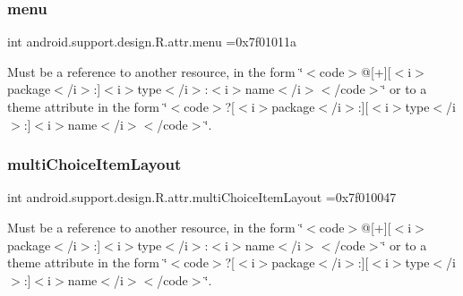 \subsubsection{\texorpdfstring{menu}{menu}}
{\footnotesize\ttfamily int android.\+support.\+design.\+R.\+attr.\+menu =0x7f01011a\hspace{0.3cm}{\ttfamily [static]}}

Must be a reference to another resource, in the form \char`\"{}$<$code$>$@\mbox{[}+\mbox{]}\mbox{[}$<$i$>$package$<$/i$>$\+:\mbox{]}$<$i$>$type$<$/i$>$\+:$<$i$>$name$<$/i$>$$<$/code$>$\char`\"{} or to a theme attribute in the form \char`\"{}$<$code$>$?\mbox{[}$<$i$>$package$<$/i$>$\+:\mbox{]}\mbox{[}$<$i$>$type$<$/i$>$\+:\mbox{]}$<$i$>$name$<$/i$>$$<$/code$>$\char`\"{}. \mbox{\label{classandroid_1_1support_1_1design_1_1R_1_1attr_a52df08b0a39a788dc12dab79f50da855}} 
\subsubsection{\texorpdfstring{multi\+Choice\+Item\+Layout}{multiChoiceItemLayout}}
{\footnotesize\ttfamily int android.\+support.\+design.\+R.\+attr.\+multi\+Choice\+Item\+Layout =0x7f010047\hspace{0.3cm}{\ttfamily [static]}}

Must be a reference to another resource, in the form \char`\"{}$<$code$>$@\mbox{[}+\mbox{]}\mbox{[}$<$i$>$package$<$/i$>$\+:\mbox{]}$<$i$>$type$<$/i$>$\+:$<$i$>$name$<$/i$>$$<$/code$>$\char`\"{} or to a theme attribute in the form \char`\"{}$<$code$>$?\mbox{[}$<$i$>$package$<$/i$>$\+:\mbox{]}\mbox{[}$<$i$>$type$<$/i$>$\+:\mbox{]}$<$i$>$name$<$/i$>$$<$/code$>$\char`\"{}. \mbox{\label{classandroid_1_1support_1_1design_1_1R_1_1attr_a26a0680c8c9447209795db42f11f7d95}} 
